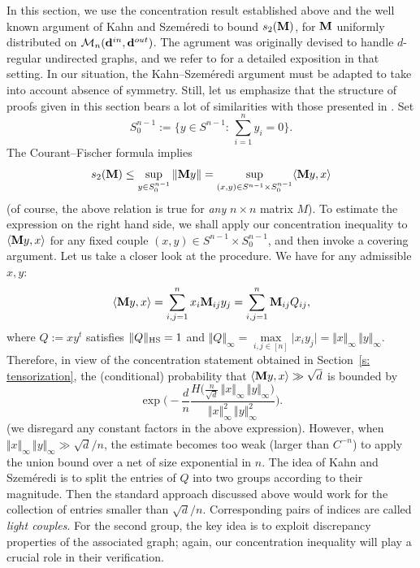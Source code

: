 \documentclass[12pt]{article}
\theoremstyle{definition}
\theoremstyle{plain}
\def\ranmtx{{\bf{}M}}
\def\vofones{{\bf{}1}}
\def\InDeg{{\bf d}^{in}}
\def\OutDeg{{\bf d}^{out}}
\def\MatrixSet{{\mathcal M}_n}
\begin{document}
In this section, we use the concentration result established above and the
well known argument of Kahn and Szem\'eredi \cite{FKS}
to bound $s_2(\ranmtx)$, for $\ranmtx$ uniformly distributed on $\MatrixSet(\InDeg,\OutDeg)$.
The agrument was originally devised to handle $d$-regular undirected graphs, and we refer to \cite{CGJ} for a detailed exposition in that setting. 
In our situation, the Kahn--Szem\'eredi argument must be adapted to take into account absence of symmetry.
Still, let us emphasize that the structure of proofs given in this section bears a lot of similarities with those presented in \cite{CGJ}.
Set
$$S_0^{n-1}:=\Big\{y\in S^{n-1}:\, \sum_{i=1}^ny_i=0\Big\}.$$
The Courant--Fischer formula implies
$$
s_2(\ranmtx)\leq \sup_{y\in S_0^{n-1}} \Vert \ranmtx y\Vert=  \sup_{(x,y)\in S^{n-1}\times S_0^{n-1}} \langle \ranmtx y,x\rangle
$$
(of course, the above relation is true for {\it any} $n\times n$ matrix $M$).
To estimate the expression on the right hand side, we shall apply
our concentration inequality to $\langle \ranmtx y,x\rangle$ 
for any fixed couple $(x,y)\in S^{n-1}\times S_0^{n-1}$, and then invoke a covering argument.
Let us take a closer look at the procedure.
We have for any admissible $x,y$:
$$
\langle \ranmtx y,x\rangle= \sum_{i,j=1}^n x_i\ranmtx_{ij}  y_j=\sum_{i,j=1}^n \ranmtx_{ij}Q_{ij},
$$
where $Q:= xy^t$ satisfies $\Vert Q\Vert_{\rm HS}=1$ and 
$\Vert Q\Vert_{\infty}= \max\limits_{i,j\in [n]} \vert x_iy_j\vert= \Vert x\Vert_{\infty}\, \Vert y\Vert_\infty$. 
Therefore, in view of the concentration statement obtained in Section~\ref{s: tensorization}, the (conditional) probability that
$\langle \ranmtx y,x\rangle\gg\sqrt{d}$ is bounded by 
$$
\exp\bigg(-\frac{d}{n}\frac{H\big(\frac{n}{\sqrt{d}}\, \Vert x\Vert_{\infty}\, \Vert y\Vert_\infty\big)}{\Vert x\Vert_{\infty}^2\, \Vert y\Vert_\infty^2}\bigg).
$$
(we disregard any constant factors in the above expression).
However, when $\Vert x\Vert_{\infty}\, \Vert y\Vert_\infty\gg\sqrt{d}/n$, the estimate
becomes too weak (larger than $C^{-n}$)
to apply the union bound over a net of size exponential in $n$. The idea of Kahn and Szem\'eredi is to split the entries of $Q$ 
into two groups
according to their magnitude.
Then the standard approach discussed above
would work for the collection of entries smaller than $\sqrt{d}/n$.
Corresponding pairs of indices are called \textit{light couples}.
For the second group,
the key idea is to exploit discrepancy properties of the associated graph;
again, our concentration inequality will play a crucial role in their verification.
\end{document}
